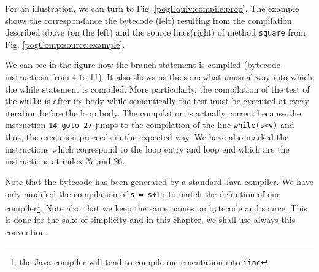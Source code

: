 For an illustration, we can turn to Fig. \ref{pogEquiv:compile:prop}.
The example shows the correspondance  the bytecode (left) resulting from the compilation described above (on the left)  and the source lines(right)
 of method  \lstinline!square! from Fig. \ref{pogComp:source:example}.

We can see in the figure how the branch statement is compiled (bytecode instructiosn from 4 to 11).
 It also shows us the somewhat unusual way into which 
the while statement is compiled. More particularly, the compilation of the test of the \lstinline!while! is after its body while semantically the test must be executed 
at every iteration before the loop body.  The compilation is actually correct because the instruction 
\lstinline!14 goto 27! jumps to the compilation of the line \lstinline!while(s<v)! and thus, the execution proceeds in the expected way.
 We have also marked the instructions which correspond to the loop entry and loop end  which are the instructions at index 27 and 26. 
 

Note that the bytecode has been generated by a standard Java compiler. We have only modified the compilation of  \lstinline!s = s+1;! to match the definition 
of our compiler\footnote{the Java compiler will tend to compile incrementation into \lstinline!iinc!}. Note also that we keep the same names on bytecode and source.
This is done for the sake of simplicity and in this chapter, we shall use always this convention.

